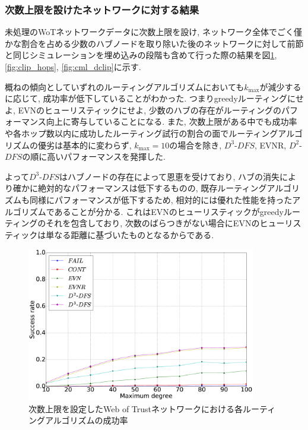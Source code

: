 \documentclass[dvipdfmx]{ampbt}
\begin{document}
   \subsubsection{次数上限を設けたネットワークに対する結果}
   未処理のWoTネットワークデータに次数上限を設け, ネットワーク全体でごく僅かな割合を占める少数のハブノードを取り除いた後のネットワークに対して前節と同じシミュレーションを埋め込みの段階も含めて行った際の結果を図\ref{fig:clip_succ}, \ref{fig:clip_hops}, \ref{fig:cml_dclip}に示す.

   概ねの傾向としていずれのルーティングアルゴリズムにおいても$k_{\max}$が減少するに応じて, 成功率が低下していることがわかった. つまりgreedyルーティングにせよ, EVNのヒューリスティックにせよ, 少数のハブの存在がルーティングのパフォーマンス向上に寄与していることになる. また, 次数上限がある中でも成功率や各ホップ数以内に成功したルーティング試行の割合の面でルーティングアルゴリズムの優劣は基本的に変わらず, $k_{\max}=10$の場合を除き, $D^3$-$DFS$, EVNR, $D^2$-$DFS$の順に高いパフォーマンスを発揮した.

   よって$D^3$-$DFS$はハブノードの存在によって恩恵を受けており, ハブの消失により確かに絶対的なパフォーマンスは低下するものの, 既存ルーティングアルゴリズムも同様にパフォーマンスが低下するため, 相対的には優れた性能を持ったアルゴリズムであることが分かる. これはEVNのヒューリスティックがgreedyルーティングのそれを包含しており, 次数のばらつきがない場合にEVNのヒューリスティックは単なる距離に基づいたものとなるからである.

   \begin{figure}[htbp]
    \centerline{\includegraphics[width=100mm]{../fig/clip_succ.eps}}
    \caption{次数上限を設定したWeb of Trustネットワークにおける各ルーティングアルゴリズムの成功率}
    \label{fig:clip_succ}
   \end{figure}
\end{document}
